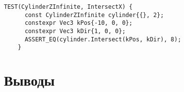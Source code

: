 \begin{lstlisting}[gobble=8, language=C++23, caption={Юнит-тест метода пересечения луча с поверхностью цилиндра\label{lst:cpp-unit-tests-intersection}}]
	TEST(CylinderZInfinite, IntersectX) {
	  const CylinderZInfinite cylinder{{}, 2};
	  constexpr Vec3 kPos{-10, 0, 0};
	  constexpr Vec3 kDir{1, 0, 0};
	  ASSERT_EQ(cylinder.Intersect(kPos, kDir), 8);
	}
\end{lstlisting}

\section*{Выводы}
